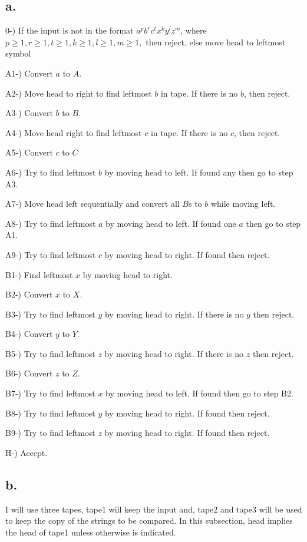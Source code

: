 \documentclass[12pt]{article}
\begin{document}
\subsection*{a.}

0-) If the input is not in the format $a^pb^rc^tx^ky^lz^m$,
 where $p \geq 1, r \geq 1, t \geq 1, k \geq 1, l \geq 1, m \geq 1,$ then reject,
 else move head to leftmost symbol

A1-) Convert $a$ to $A$.

A2-) Move head to right to find leftmost $b$ in tape. If there is no $b$, then reject.

A3-) Convert $b$ to $B$. 

A4-) Move head right to find leftmost $c$ in tape. If there is no $c$, then reject.

A5-) Convert $c$ to $C$

A6-) Try to find leftmost $b$ by moving head to left. If found any then go to step A3.

A7-) Move head left sequentially and convert all $B$s to $b$ while moving left.

A8-) Try to find leftmost $a$ by moving head to left. If found one $a$ then go to step A1.

A9-) Try to find leftmost $c$ by moving head to right. If found then reject.

B1-) Find leftmost $x$ by moving head to right.

B2-) Convert $x$ to $X$.

B3-) Try to find leftmost $y$ by moving head to right. If there is no $y$ then reject.

B4-) Convert $y$ to $Y$.

B5-) Try to find leftmost $z$ by moving head to right. If there is no $z$ then reject.

B6-) Convert $z$ to $Z$.

B7-) Try to find leftmost $x$ by moving head to left. If found then go to step B2.

B8-) Try to find leftmost $y$ by moving head to right. If found then reject.

B9-) Try to find leftmost $z$ by moving head to right. If found then reject.

H-) Accept.

\subsection*{b.}

I will use three tapes, tape1 will keep the input and, tape2 and tape3 will be used to keep the 
copy of the strings to be compared. In this subsection, head implies the head of tape1 
unless otherwise is indicated.
\end{document}
